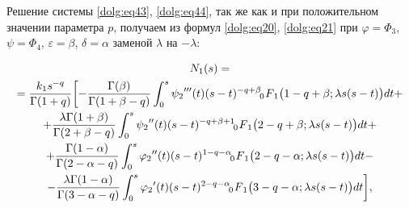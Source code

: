 Решение системы \eqref{dolg:eq43}, \eqref{dolg:eq44}, так же как и при положительном значении параметра $p$, получаем из формул \eqref{dolg:eq20}, \eqref{dolg:eq21} при $\varphi=\Phi_3$, $\psi=\Phi_4$, $\varepsilon=\beta$, $\delta=\alpha$ заменой $\lambda$ на $-\lambda$:

\begin{multline}

 N_1(s) =

 \\

 = \frac{k_1 s^{-q}}{\Gamma(1+q)} 

 \biggl[ -\frac{\Gamma(\beta)}{\Gamma(1+\beta-q)} \int _0^s {\psi_2}'''(t) (s-t)^{-q+\beta}  \,\,

F_{\hspace{-4mm}0 \hspace{3mm}1} \bigl(1-q+\beta;\lambda s (s-t)\bigr) dt + 

\\

 + \frac{\lambda\Gamma(1+\beta)}{\Gamma(2+\beta-q)} \int _0^s {\psi_2}''(t) (s-t)^{-q+\beta+1}  \,\,

F_{\hspace{-4mm}0 \hspace{3mm}1} \bigl(2-q+\beta;\lambda s (s-t)\bigr) dt + 

\\

 +\frac{\Gamma(1-\alpha)}{\Gamma(2-\alpha-q)} \int _0^s {\varphi_2}''(t) (s-t)^{1-q-\alpha}  \,\,

F_{\hspace{-4mm}0 \hspace{3mm}1} \bigl(2-q-\alpha;\lambda s (s-t)\bigr) dt - 

\\

\label{dolg:eq46}

 -  \frac{\lambda \Gamma(1-\alpha)}{\Gamma(3-\alpha-q)} \int _0^s {\varphi_2}'(t) (s-t)^{2-q-\alpha}  \,\,

F_{\hspace{-4mm}0 \hspace{3mm}1} \bigl(3-q-\alpha;\lambda s (s-t)\bigr) dt\biggr],

\end{multline}

